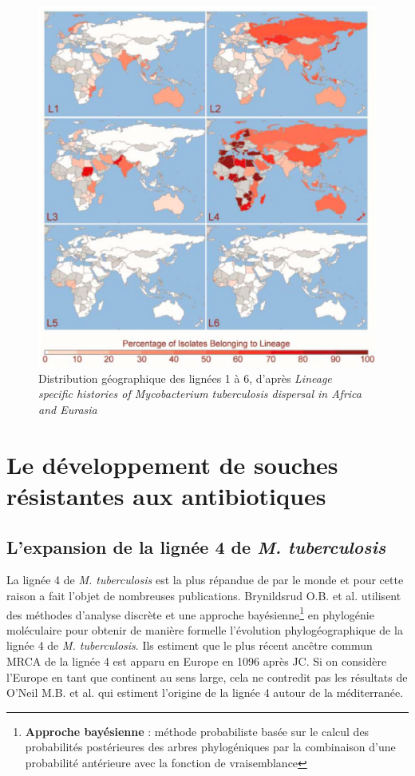 \documentclass[twoside,a4paper,11pt,frenchb,openany]{report}
\begin{document}
\begin{figure}
\centering
\includegraphics[scale=0.5]{world.png}
\caption{Distribution géographique des lignées 1 à 6, d'après \textit{Lineage\\ specific histories of Mycobacterium tuberculosis dispersal in Africa and Eurasia}}
\end{figure}


\section{Le développement de souches résistantes aux antibiotiques}

\subsection{L'expansion de la lignée 4 de \textit{M. tuberculosis}}


La lignée 4 de \textit{M. tuberculosis} est la plus répandue de par le monde et pour cette raison a fait l'objet de nombreuses publications. Brynildsrud O.B. et al.\cite{brynildsrud} utilisent des méthodes d'analyse discrète et une approche bayésienne\footnote{\textbf{Approche bayésienne} : méthode probabiliste basée sur le calcul des probabilités postérieures des arbres phylogéniques par la combinaison d'une probabilité antérieure avec la fonction de vraisemblance} en phylogénie moléculaire pour obtenir de manière formelle l'évolution phylogéographique de la lignée 4 de \textit{M. tuberculosis}. Ils estiment que le plus récent ancêtre commun MRCA de la lignée 4 est apparu en Europe en 1096 après JC. Si on considère l'Europe en tant que continent au sens large, cela ne contredit pas les résultats de O'Neil M.B. et al.\cite{oneil} qui estiment l'origine de la lignée 4 autour de la méditerranée.
\end{document}
